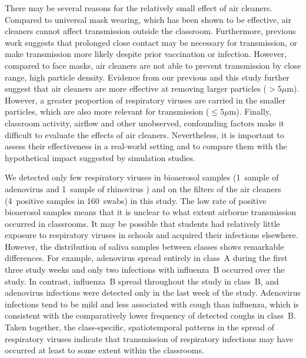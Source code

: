 \documentclass[fleqn,11pt]{wlscirep}
\begin{document}
There may be several reasons for the relatively small effect of air cleaners. Compared to \eg universal mask wearing, which has been shown to be effective\cite{Banholzer2023PLoSMed,Heinsohn2022,Gettings2021,Leung2020NatMed,Milton2013PLoSPathogens}, air cleaners cannot affect transmission outside the classroom. Furthermore, previous work suggests that prolonged close contact may be necessary for transmission\cite{Leung2020NatMed,Brankston2007LancetID}, or make transmission more likely despite prior vaccination or infection\cite{Lind2023NatCommun}. However, compared to face masks, air cleaners are not able to prevent transmission by close range, high particle density. Evidence from our previous\cite{Banholzer2023PLoSMed} and this study further suggest that air cleaners are more effective at removing larger particles ($>5\mu$m). However, a greater proportion of respiratory viruses are carried in the smaller particles, which are also more relevant for transmission ($\leq5\mu$m)\cite{Fennelly2020}. Finally, classroom activity, airflow and other unobserved, confounding factors make it difficult to evaluate the effects of air cleaners. Nevertheless, it is important to assess their effectiveness in a real-world setting and to compare them with the hypothetical impact suggested by simulation studies\cite{Lindsley2021,Cortellessa2023Build}.


We detected only few respiratory viruses in bioaerosol samples (1~sample of adenovirus and 1~sample of rhinovirus ) and on the filters of the air cleaners (4~positive samples in 160~swabs) in this study. The low rate of positive bioaerosol samples means that it is unclear to what extent airborne transmission occurred in classrooms. It may be possible that students had relatively little exposure to respiratory viruses in schools and acquired their infections elsewhere. However, the distribution of saliva samples between classes shows remarkable differences. For example, adenovirus spread entirely in class~A during the first three study weeks and only two infections with influenza~B occurred over the study. In contrast, influenza~B spread throughout the study in class~B, and adenovirus infections were detected only in the last week of the study. Adenovirus infections tend to be mild\cite{Kunz2010CIDR} and less associated with cough than influenza\cite{Ma2018RMV}, which is consistent with the comparatively lower frequency of detected coughs in class~B. Taken together, the class-specific, spatiotemporal patterns in the spread of respiratory viruses indicate that transmission of respiratory infections may have occurred at least to some extent within the classrooms. 
\end{document}
